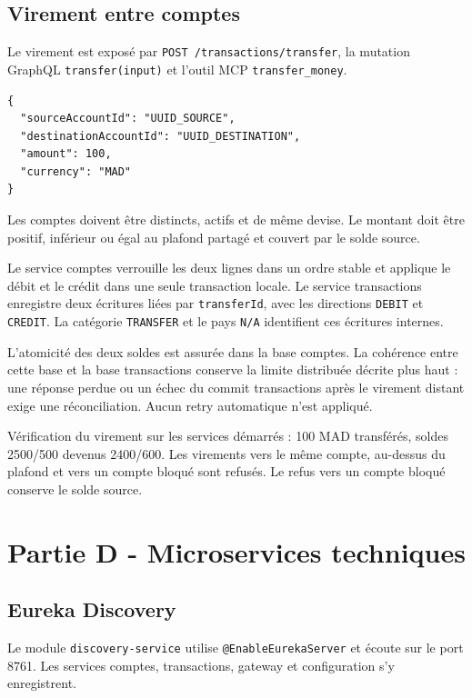 \documentclass[11pt,a4paper]{report}
\begin{document}
\section{Virement entre comptes}

Le virement est exposé par \nolinkurl{POST /transactions/transfer}, la mutation GraphQL \nolinkurl{transfer(input)} et l'outil MCP \nolinkurl{transfer_money}.

\begin{lstlisting}
{
  "sourceAccountId": "UUID_SOURCE",
  "destinationAccountId": "UUID_DESTINATION",
  "amount": 100,
  "currency": "MAD"
}
\end{lstlisting}

Les comptes doivent être distincts, actifs et de même devise. Le montant doit être positif, inférieur ou égal au plafond partagé et couvert par le solde source.

Le service comptes verrouille les deux lignes dans un ordre stable et applique le débit et le crédit dans une seule transaction locale. Le service transactions enregistre deux écritures liées par \nolinkurl{transferId}, avec les directions \nolinkurl{DEBIT} et \nolinkurl{CREDIT}. La catégorie \nolinkurl{TRANSFER} et le pays \nolinkurl{N/A} identifient ces écritures internes.

L'atomicité des deux soldes est assurée dans la base comptes. La cohérence entre cette base et la base transactions conserve la limite distribuée décrite plus haut : une réponse perdue ou un échec du commit transactions après le virement distant exige une réconciliation. Aucun retry automatique n'est appliqué.

Vérification du virement sur les services démarrés : 100 MAD transférés, soldes 2500/500 devenus 2400/600. Les virements vers le même compte, au-dessus du plafond et vers un compte bloqué sont refusés. Le refus vers un compte bloqué conserve le solde source.


\chapter{Partie D - Microservices techniques}

\section{Eureka Discovery}

Le module \nolinkurl{discovery-service} utilise \nolinkurl{@EnableEurekaServer} et écoute sur le port 8761. Les services comptes, transactions, gateway et configuration s'y enregistrent.
\end{document}
